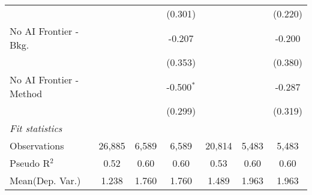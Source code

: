 \begin{tabular}{lcccccc}
                           &              &         & (0.301)      &               &              & (0.220)\\   
   No AI Frontier - Bkg.   &              &         & -0.207       &               &              & -0.200\\   
                           &              &         & (0.353)      &               &              & (0.380)\\   
   No AI Frontier - Method &              &         & -0.500$^{*}$ &               &              & -0.287\\   
                           &              &         & (0.299)      &               &              & (0.319)\\   
   \midrule
   \emph{Fit statistics}\\
   Observations            & 26,885       & 6,589   & 6,589        & 20,814        & 5,483        & 5,483\\  
   Pseudo R$^2$            & 0.52         & 0.60    & 0.60         & 0.53          & 0.60         & 0.60\\  
Mean(Dep. Var.) & 1.238 & 1.760 & 1.760 & 1.489 & 1.963 & 1.963 \\
   

\end{tabular}
